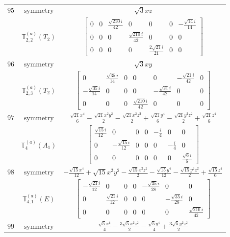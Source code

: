 \documentclass[fleqn,8pt,landscape]{jsarticle}
\begin{document}
\begin{longtable}{ccc}
$ 95 $ & $ \text{symmetry} $ & $ \sqrt{3} x z $ \\
$  $ & $ \mathbb{T}_{2,2}^{(a)}(T_{2}) $ & $ \begin{bmatrix} 0 & 0 & \frac{\sqrt{210} i}{42} & 0 & 0 & 0 & - \frac{\sqrt{14} i}{14} \\ 0 & 0 & 0 & \frac{\sqrt{210} i}{42} & 0 & 0 & 0 \\ 0 & 0 & 0 & 0 & \frac{2 \sqrt{21} i}{21} & 0 & 0 \end{bmatrix} $ \\ \hline
$ 96 $ & $ \text{symmetry} $ & $ \sqrt{3} x y $ \\
$  $ & $ \mathbb{T}_{2,3}^{(a)}(T_{2}) $ & $ \begin{bmatrix} 0 & \frac{\sqrt{35} i}{14} & 0 & 0 & 0 & - \frac{\sqrt{21} i}{42} & 0 \\ - \frac{\sqrt{35} i}{14} & 0 & 0 & 0 & - \frac{\sqrt{21} i}{42} & 0 & 0 \\ 0 & 0 & 0 & \frac{\sqrt{210} i}{42} & 0 & 0 & 0 \end{bmatrix} $ \\ \hline
$ 97 $ & $ \text{symmetry} $ & $ \frac{\sqrt{21} x^{4}}{6} - \frac{\sqrt{21} x^{2} y^{2}}{2} - \frac{\sqrt{21} x^{2} z^{2}}{2} + \frac{\sqrt{21} y^{4}}{6} - \frac{\sqrt{21} y^{2} z^{2}}{2} + \frac{\sqrt{21} z^{4}}{6} $ \\
$  $ & $ \mathbb{T}_{4}^{(a)}(A_{1}) $ & $ \begin{bmatrix} \frac{\sqrt{15} i}{12} & 0 & 0 & 0 & - \frac{i}{4} & 0 & 0 \\ 0 & - \frac{\sqrt{15} i}{12} & 0 & 0 & 0 & - \frac{i}{4} & 0 \\ 0 & 0 & 0 & 0 & 0 & 0 & \frac{\sqrt{6} i}{6} \end{bmatrix} $ \\ \hline
$ 98 $ & $ \text{symmetry} $ & $ - \frac{\sqrt{15} x^{4}}{12} + \sqrt{15} x^{2} y^{2} - \frac{\sqrt{15} x^{2} z^{2}}{2} - \frac{\sqrt{15} y^{4}}{12} - \frac{\sqrt{15} y^{2} z^{2}}{2} + \frac{\sqrt{15} z^{4}}{6} $ \\
$  $ & $ \mathbb{T}_{4,1}^{(a)}(E) $ & $ \begin{bmatrix} - \frac{\sqrt{21} i}{12} & 0 & 0 & 0 & - \frac{\sqrt{35} i}{28} & 0 & 0 \\ 0 & \frac{\sqrt{21} i}{12} & 0 & 0 & 0 & - \frac{\sqrt{35} i}{28} & 0 \\ 0 & 0 & 0 & 0 & 0 & 0 & \frac{\sqrt{210} i}{42} \end{bmatrix} $ \\ \hline
$ 99 $ & $ \text{symmetry} $ & $ \frac{\sqrt{5} x^{4}}{4} - \frac{3 \sqrt{5} x^{2} z^{2}}{2} - \frac{\sqrt{5} y^{4}}{4} + \frac{3 \sqrt{5} y^{2} z^{2}}{2} $ \\

\end{longtable}
\end{document}
